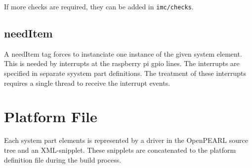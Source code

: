 If more checks are required, they can be added in \texttt{imc/checks}. 

\subsection{needItem}

A needItem tag forces to instanciate one instance of the given system element.
This is needed by interrupts at the raspberry pi gpio lines. The interrupts are
specified in separate syystem part definitions. 
The treatment of these interrupts requires a single thread to receive the 
interrupt events.

 
\section{Platform File}
Each system part elements is represented by a driver in the OpenPEARL 
source tree and an XML-snipplet. These snipplets are
concatenated to the platform definition file during the build  process.

